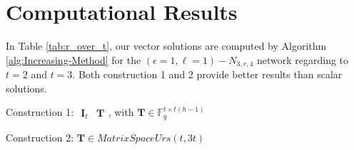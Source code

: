 \chapter{Computational Results} \label{chap:comp_method}

In Table \ref{tab:r_over_t}, our vector solutions are computed by
Algorithm \ref{alg:Increasing-Method} for the $\left(\epsilon=1,\ell=1\right)-\ensuremath{N}_{3,r,4}$
network regarding to $t=2$ and $t=3$. Both construction 1 and 2
provide better results than scalar solutions. 

Construction 1: $\begin{array}{c|c}
\boldsymbol{I}_{t} & \boldsymbol{T}\end{array}$, with $\boldsymbol{T}\in\ensuremath{\mathbb{F}}_{q}^{t\times t\left(h-1\right)}$

Construction 2: $\boldsymbol{T}\in MatrixSpaceUrs\left(t,3t\right)$

